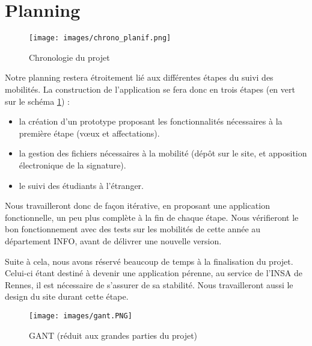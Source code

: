 \section{Planning}
\begin{figure}[H]
	\centering
	\texttt{[image: images/chrono\_planif.png]}
	\caption{Chronologie du projet}
	\label{fig::chrono}
\end{figure}

Notre planning restera étroitement lié aux différentes étapes du suivi des mobilités. La construction de l'application se fera donc en trois étapes (en vert sur le schéma \ref{fig::chrono}) :
\begin{itemize}
 \item la création d'un prototype proposant les fonctionnalités nécessaires à la première étape (vœux et affectations).
 \item la gestion des fichiers nécessaires à la mobilité (dépôt sur le site, et apposition électronique de la signature).
 \item le suivi des étudiants à l'étranger.
\end{itemize}
Nous travailleront donc de façon itérative, en proposant une application fonctionnelle, un peu plus complète à la fin de chaque étape. Nous vérifieront le bon fonctionnement avec des tests sur les mobilités de cette année au département INFO, avant de délivrer une nouvelle version. 


Suite à cela, nous avons réservé beaucoup de temps à la finalisation du projet. Celui-ci étant destiné à devenir une application pérenne, au service de l'INSA de Rennes, il est nécessaire de s'assurer de sa stabilité. Nous travailleront aussi le design du site durant cette étape. 

\begin{figure}[H]
	\centering
	\texttt{[image: images/gant.PNG]}
	\caption{GANT (réduit aux grandes parties du projet)}
\end{figure}

